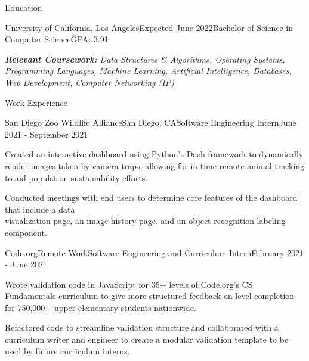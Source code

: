 \documentclass{resume}
\begin{document}
\begin{rSection}{Education}

\begin{rSubsection}{University of California, Los Angeles}{Expected June 2022}{Bachelor of Science in Computer Science}{GPA: 3.91}
\item \textit{\textbf{Relevant Coursework:} Data Structures \& Algorithms, Operating Systems, Programming Languages, Machine Learning, Artificial Intelligence, Databases, Web Development, Computer Networking (IP)}

\end{rSubsection}

\end{rSection}


\begin{rSection}{Work Experience}

\begin{rSubsection}{San Diego Zoo Wildlife Alliance}{San Diego, CA}{Software Engineering Intern}{June 2021 - September 2021}
\item Created an interactive dashboard using Python's Dash framework to dynamically render images taken by camera traps, allowing for in time remote animal tracking to aid population sustainability efforts.
\item Conducted meetings with end users to determine core features of the dashboard that include a data \\ visualization page, an image history page, and an object recognition labeling component.
\end{rSubsection}

\begin{rSubsection}{Code.org}{Remote Work}{Software Engineering and Curriculum  Intern}{February 2021 - June 2021}
\item Wrote validation code in JavaScript for 35+ levels of Code.org's CS Fundamentals curriculum to give more structured feedback on level completion for 750,000+ upper elementary students nationwide.
\item Refactored code to streamline validation structure and collaborated with a curriculum writer and engineer to create a modular validation template to be used by future curriculum interns.
\end{rSubsection}
\end{rSection}
\end{document}
